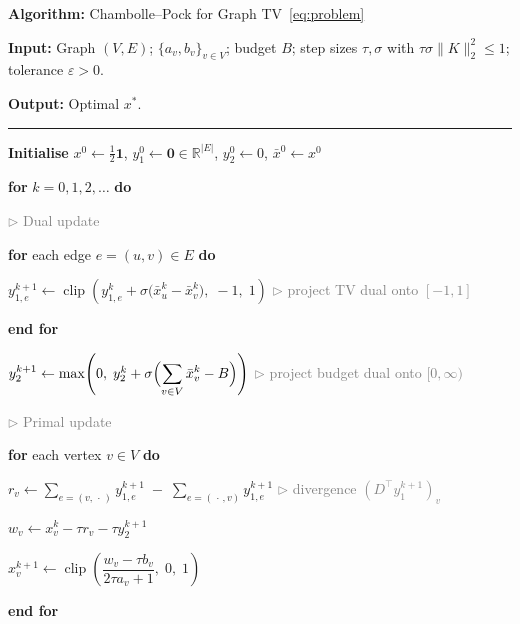 \documentclass{article}
\newcommand{\clip}{\operatorname{clip}}
\newcommand{\R}{\mathbb{R}}
\newcommand{\kw}[1]{\textbf{#1}}          %
\newcommand{\cmt}[1]{\textcolor{gray}{\(\triangleright\) #1}}  %
\begin{document}
\begin{mdframed}[
  linewidth=0.8pt,
  innertopmargin=8pt,
  innerbottommargin=8pt,
  innerrightmargin=10pt,
  innerleftmargin=10pt,
]
\textbf{Algorithm:} Chambolle--Pock for Graph TV~\eqref{eq:problem}

\medskip
\textbf{Input:} Graph $(V,E)$;\; $\{a_v, b_v\}_{v \in V}$;\; budget $B$;\;
step sizes $\tau,\sigma$ with $\tau\sigma\|K\|_2^2 \leq 1$;\;
tolerance $\varepsilon > 0$.

\smallskip
\textbf{Output:} Optimal $x^*$.

\medskip\hrule\medskip

\begin{algolist}
  \item \textbf{Initialise}\;
    $x^0 \leftarrow \tfrac{1}{2}\mathbf{1}$,\quad
    $y_1^0 \leftarrow \mathbf{0} \in \R^{|E|}$,\quad
    $y_2^0 \leftarrow 0$,\quad
    $\bar x^0 \leftarrow x^0$

  \item \kw{for} $k = 0, 1, 2, \dotsc$ \kw{do}

  \begin{algoinner}
    \item \cmt{Dual update}
    \item \kw{for} each edge $e = (u,v) \in E$ \kw{do}
    \begin{algoinner}
      \item $y_{1,e}^{k+1} \leftarrow
        \clip\!\left(
          y_{1,e}^{k} + \sigma\bigl(\bar x_u^k - \bar x_v^k\bigr),\;
          -1,\; 1
        \right)$
        \hfill\cmt{project TV dual onto $[-1,1]$}
    \end{algoinner}
    \item \kw{end for}
    \item $y_2^{k+1} \leftarrow
      \max\!\left(0,\;
        y_2^k + \sigma\Bigl(\displaystyle\sum_{v \in V} \bar x_v^k - B\Bigr)
      \right)$
      \hfill\cmt{project budget dual onto $[0,\infty)$}

    \medskip
    \item \cmt{Primal update}
    \item \kw{for} each vertex $v \in V$ \kw{do}
    \begin{algoinner}
      \item $r_v \leftarrow
        \displaystyle
        \sum_{e = (v,\,\cdot\,)} y_{1,e}^{k+1}
        \;-\;
        \sum_{e = (\,\cdot\,,v)} y_{1,e}^{k+1}$
        \hfill\cmt{divergence $(D^\top y_1^{k+1})_v$}
      \item $w_v \leftarrow x_v^k - \tau r_v - \tau y_2^{k+1}$
      \item $x_v^{k+1} \leftarrow
        \clip\!\left(
          \dfrac{w_v - \tau b_v}{2\tau a_v + 1},\; 0,\; 1
        \right)$
    \end{algoinner}
    \item \kw{end for}


\end{algoinner}
\end{algolist}
\end{mdframed}
\end{document}
